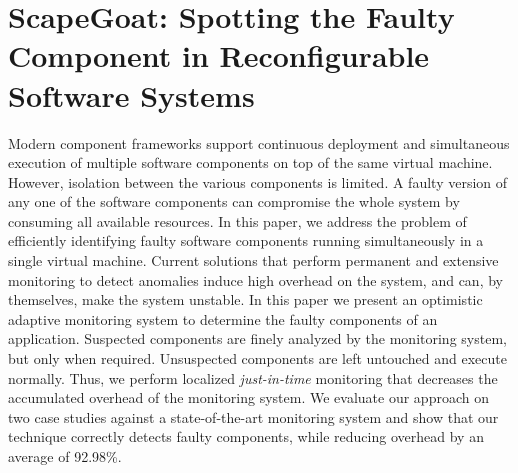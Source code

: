 
\chapter{ScapeGoat: Spotting the Faulty Component in Reconfigurable Software Systems}



Modern component frameworks support continuous deployment and simultaneous execution of multiple software components on
top of the same virtual machine.
However, isolation between the various components is limited.
A faulty version of any one of the software components can compromise the whole system by consuming all available resources.
In this paper, we address the problem of efficiently identifying faulty software components running simultaneously in a single virtual machine.
Current solutions that perform permanent and extensive monitoring to detect anomalies induce high overhead on the system,
and can, by themselves, make the system unstable.
In this paper we present an optimistic adaptive monitoring system to determine the faulty components of an application.
Suspected components are finely analyzed by the monitoring system, but only when required.
Unsuspected components are left untouched and execute normally.
Thus, we perform localized \textit{just-in-time} monitoring that decreases the accumulated overhead of the monitoring system.
We evaluate our approach on two case studies against a state-of-the-art monitoring system and show that our technique correctly
detects faulty components, while reducing overhead by an average of 92.98\%.


